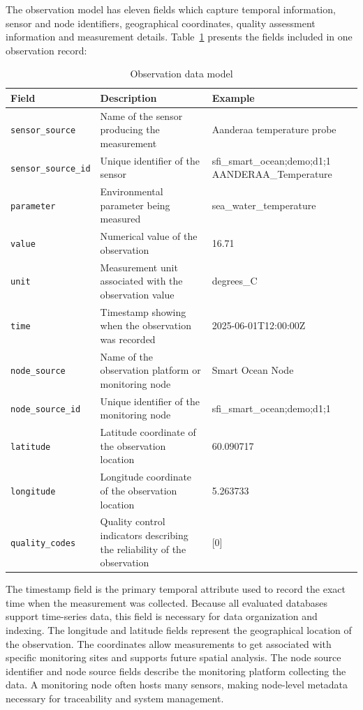 The observation model has eleven fields which capture temporal information, sensor and node identifiers, geographical coordinates, quality assessment information and measurement details. Table~\ref{tab:observation-fields} presents the fields included in one observation record:


\begin{table}[h]
\centering
\begin{tabular}{|p{3cm}|p{6.5cm}|p{4.5cm}|}
\hline
\textbf{Field} & \textbf{Description} & \textbf{Example} \\
\hline
\texttt{sensor\_source} & Name of the sensor producing the measurement & Aanderaa temperature probe \\
\hline
\texttt{sensor\_source\_id} & Unique identifier of the sensor & sfi\_smart\_ocean;demo;d1;1 AANDERAA\_Temperature \\
\hline
\texttt{parameter} & Environmental parameter being measured & sea\_water\_temperature \\
\hline
\texttt{value} & Numerical value of the observation & 16.71 \\
\hline
\texttt{unit} & Measurement unit associated with the observation value & degrees\_C \\
\hline
\texttt{time} & Timestamp showing when the observation was recorded & 2025-06-01T12:00:00Z \\
\hline
\texttt{node\_source} & Name of the observation platform or monitoring node & Smart Ocean Node \\
\hline
\texttt{node\_source\_id} & Unique identifier of the monitoring node & sfi\_smart\_ocean;demo;d1;1 \\
\hline
\texttt{latitude} & Latitude coordinate of the observation location & 60.090717 \\
\hline
\texttt{longitude} & Longitude coordinate of the observation location & 5.263733 \\
\hline
\texttt{quality\_codes} & Quality control indicators describing the reliability of the observation & [0] \\
\hline
\end{tabular}
\caption{Observation data model}
\label{tab:observation-fields}
\end{table}


The timestamp field is the primary temporal attribute used to record the exact time when the measurement was collected. Because all evaluated databases support time-series data, this field is necessary for data organization and indexing. The longitude and latitude fields represent the geographical location of the observation. The coordinates allow measurements to get associated with specific monitoring sites and supports future spatial analysis. The node source identifier and node source fields describe the monitoring platform collecting the data. A monitoring node often hosts many sensors, making node-level metadata necessary for traceability and system management. 

